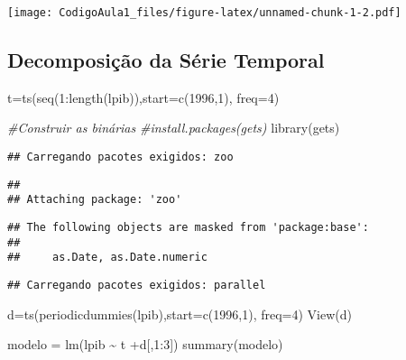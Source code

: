\documentclass[
]{article}
\newenvironment{Shaded}{\begin{snugshade}}{\end{snugshade}}
\newcommand{\AttributeTok}[1]{\textcolor[rgb]{0.77,0.63,0.00}{#1}}
\newcommand{\CommentTok}[1]{\textcolor[rgb]{0.56,0.35,0.01}{\textit{#1}}}
\newcommand{\DecValTok}[1]{\textcolor[rgb]{0.00,0.00,0.81}{#1}}
\newcommand{\FunctionTok}[1]{\textcolor[rgb]{0.00,0.00,0.00}{#1}}
\newcommand{\NormalTok}[1]{#1}
\newcommand{\OtherTok}[1]{\textcolor[rgb]{0.56,0.35,0.01}{#1}}
\newcommand{\SpecialCharTok}[1]{\textcolor[rgb]{0.00,0.00,0.00}{#1}}
\begin{document}
\texttt{[image: CodigoAula1\_files/figure-latex/unnamed-chunk-1-2.pdf]}

\hypertarget{decomposiuxe7uxe3o-da-suxe9rie-temporal}{%
\subsection{Decomposição da Série
Temporal}\label{decomposiuxe7uxe3o-da-suxe9rie-temporal}}

\begin{Shaded}
\begin{Highlighting}[]
\NormalTok{t}\OtherTok{=}\FunctionTok{ts}\NormalTok{(}\FunctionTok{seq}\NormalTok{(}\DecValTok{1}\SpecialCharTok{:}\FunctionTok{length}\NormalTok{(lpib)),}\AttributeTok{start=}\FunctionTok{c}\NormalTok{(}\DecValTok{1996}\NormalTok{,}\DecValTok{1}\NormalTok{), }\AttributeTok{freq=}\DecValTok{4}\NormalTok{)}

\CommentTok{\#Construir as binárias}
\CommentTok{\#install.packages(\textquotesingle{}gets\textquotesingle{})}
\FunctionTok{library}\NormalTok{(gets)}
\end{Highlighting}
\end{Shaded}

\begin{verbatim}
## Carregando pacotes exigidos: zoo
\end{verbatim}

\begin{verbatim}
## 
## Attaching package: 'zoo'
\end{verbatim}

\begin{verbatim}
## The following objects are masked from 'package:base':
## 
##     as.Date, as.Date.numeric
\end{verbatim}

\begin{verbatim}
## Carregando pacotes exigidos: parallel
\end{verbatim}

\begin{Shaded}
\begin{Highlighting}[]
\NormalTok{d}\OtherTok{=}\FunctionTok{ts}\NormalTok{(}\FunctionTok{periodicdummies}\NormalTok{(lpib),}\AttributeTok{start=}\FunctionTok{c}\NormalTok{(}\DecValTok{1996}\NormalTok{,}\DecValTok{1}\NormalTok{), }\AttributeTok{freq=}\DecValTok{4}\NormalTok{)}
\FunctionTok{View}\NormalTok{(d)}

\NormalTok{modelo }\OtherTok{=} \FunctionTok{lm}\NormalTok{(lpib }\SpecialCharTok{\textasciitilde{}}\NormalTok{ t }\SpecialCharTok{+}\NormalTok{d[,}\DecValTok{1}\SpecialCharTok{:}\DecValTok{3}\NormalTok{])}
\FunctionTok{summary}\NormalTok{(modelo)}
\end{Highlighting}
\end{Shaded}
\end{document}

